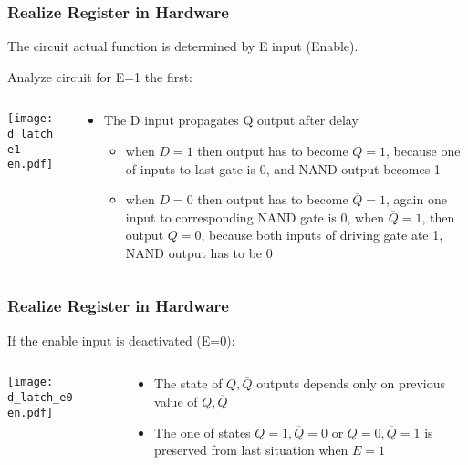 \documentclass{beamer}
\begin{document}
\begin{frame}
\frametitle{Realize Register in Hardware}

The circuit actual function is determined by E input (Enable).

Analyze circuit for E=1 the first:
\begin{columns}
\begin{column}{0.5\textwidth}
\begin{center}
\texttt{[image: d\_latch\_e1-en.pdf]}
\end{center}
\end{column}
\begin{column}{0.5\textwidth}
\begin{itemize}
\item The D input propagates Q output after delay
\begin{itemize}
\item when $D=1$ then output has to become $Q=1$, because one of inputs to last gate is 0, and NAND output becomes 1
\item when $D=0$ then output has to become $\overline{Q}=1$, again one input to corresponding NAND gate is 0, when $\overline{Q}=1$, then output $Q=0$, because both inputs of driving gate ate 1, NAND output has to be 0
\end{itemize}
\end{itemize}
\end{column}
\end{columns}

\end{frame}

\begin{frame}
\frametitle{Realize Register in Hardware}

If the enable input is deactivated (E=0):
\begin{columns}
\begin{column}{0.5\textwidth}
\begin{center}
\texttt{[image: d\_latch\_e0-en.pdf]}
\end{center}
\end{column}
\begin{column}{0.5\textwidth}
\begin{itemize}
\item The state of $Q,\overline{Q}$ outputs depends only on previous value of $Q,\overline{Q}$
\item The one of states $Q=1,\overline{Q}=0$ or $Q=0,\overline{Q}=1$ is preserved from last situation when $E=1$
\end{itemize}
\end{column}
\end{columns}

\end{frame}
\end{document}
